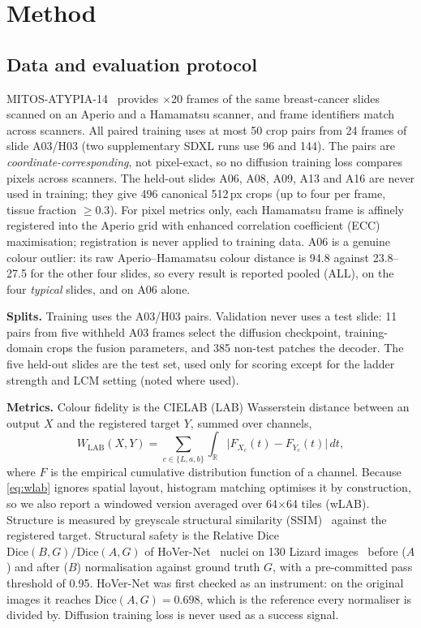 \section{Method}
\label{sec:method}

\subsection{Data and evaluation protocol}
MITOS-ATYPIA-14~\cite{roux2014mitos} provides $\times$20 frames of the same breast-cancer slides scanned
on an Aperio and a Hamamatsu scanner, and frame identifiers match across scanners. All paired training uses at
most 50 crop pairs from 24 frames of slide A03/H03 (two supplementary SDXL runs use 96 and 144). The pairs are
\emph{coordinate-corresponding}, not pixel-exact, so no diffusion training loss compares pixels across scanners. The
held-out slides A06, A08, A09, A13 and A16 are never used in training; they give 496 canonical 512\,px
crops (up to four per frame, tissue fraction $\geq 0.3$). For pixel metrics only, each Hamamatsu frame is
affinely registered into the Aperio grid with enhanced correlation coefficient (ECC) maximisation; registration is never applied to training data.
A06 is a genuine colour outlier: its raw Aperio--Hamamatsu colour distance is 94.8 against 23.8--27.5 for
the other four slides, so every result is reported pooled (ALL), on the four \emph{typical} slides, and on
A06 alone.

\textbf{Splits.} Training uses the A03/H03 pairs. Validation never uses a test slide: 11 pairs from five
withheld A03 frames select the diffusion checkpoint, training-domain crops the fusion parameters, and 385
non-test patches the decoder. The five held-out slides are the test set, used only for scoring except for
the ladder strength and LCM setting (noted where used).

\textbf{Metrics.} Colour fidelity is the CIELAB (LAB) Wasserstein distance between an output $X$ and the
registered target $Y$, summed over channels,
\begin{equation}
W_{\mathrm{LAB}}(X,Y)=\sum_{c\in\{L,a,b\}}\int_{\mathbb{R}}\bigl|F_{X_c}(t)-F_{Y_c}(t)\bigr|\,dt ,
\label{eq:wlab}
\end{equation}
where $F$ is the empirical cumulative distribution function of a channel. Because \eqref{eq:wlab} ignores spatial layout,
histogram matching optimises it by construction, so we also report a windowed version averaged over
64$\times$64 tiles (wLAB). Structure is measured by greyscale structural similarity (SSIM)~\cite{wang2004ssim} against the
registered target. Structural safety is the Relative Dice
$\mathrm{Dice}(B,G)/\mathrm{Dice}(A,G)$ of HoVer-Net~\cite{graham2019hovernet} nuclei on 130 Lizard
images~\cite{graham2021lizard} before ($A$) and after ($B$) normalisation against ground truth $G$, with a
pre-committed pass threshold of 0.95. HoVer-Net was first checked as an instrument: on the original images it
reaches $\mathrm{Dice}(A,G)=0.698$, which is the reference every normaliser is divided by. Diffusion training loss
is never used as a success signal.

